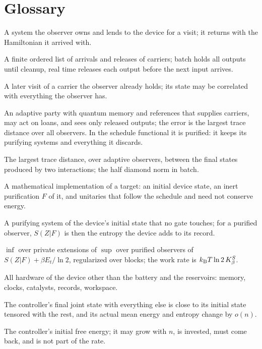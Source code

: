 \section{Glossary}\label{app:glossary}

\begin{description}[leftmargin=!,labelwidth=3.6cm,style=nextline,itemsep=2pt]
\item[Carrier] A system the observer owns and lends to the device for a visit; it returns with the Hamiltonian it arrived with.
\item[Schedule] A finite ordered list of arrivals and releases of carriers; batch holds all outputs until cleanup, real time releases each output before the next input arrives.
\item[Loan] A later visit of a carrier the observer already holds; its state may be correlated with everything the observer has.
\item[Observer (tester)] An adaptive party with quantum memory and references that supplies carriers, may act on loans, and sees only released outputs; the error is the largest trace distance over all observers. In the schedule functional it is purified: it keeps its purifying systems and everything it discards.
\item[Strategy distance] The largest trace distance, over adaptive observers, between the final states produced by two interactions; the half diamond norm in batch.
\item[Private extension] A mathematical implementation of a target: an initial device state, an inert purification $F$ of it, and unitaries that follow the schedule and need not conserve energy.
\item[Inert purification $F$] A purifying system of the device's initial state that no gate touches; for a purified observer, $S(Z|F)$ is then the entropy the device adds to its record.
\item[Schedule functional $K_\beta^S$] $\inf$ over private extensions of $\sup$ over purified observers of $S(Z|F)+\beta E_t/\ln2$, regularized over blocks; the work rate is $k_{\mathrm B} T\ln2\,K_\beta^S$.
\item[Controller] All hardware of the device other than the battery and the reservoirs: memory, clocks, catalysts, records, workspace.
\item[Returns approximately] The controller's final joint state with everything else is close to its initial state tensored with the rest, and its actual mean energy and entropy change by $o(n)$.
\item[Startup capital] The controller's initial free energy; it may grow with $n$, is invested, must come back, and is not part of the rate.

\end{description}
